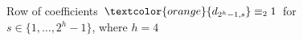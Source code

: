 
\begin{figure}[p]

    \noindent{}

    \captionsetup{singlelinecheck=off}
    \caption[.]{Row of coefficients $\textcolor{orange}{d_{2^{h}-1,s}} \equiv_{2} 1$ 
        for $s\in\lbrace1,\ldots,2^{h}-1 \rbrace$, where $h=4$ }

    \label{fig:catalan-odd-row}

\end{figure}
